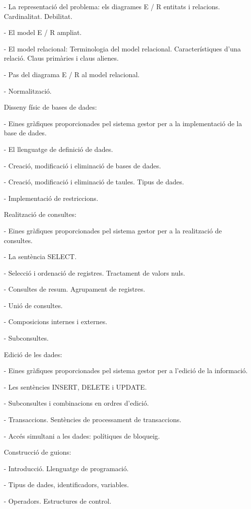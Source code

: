 \documentclass[catalan, a4paper, 12pt, titlepage]{article}
\begin{document}
- La representació del problema: els diagrames E / R entitats i relacions. Cardinalitat. Debilitat.

- El model E / R ampliat.

- El model relacional: Terminologia del model relacional. Característiques d'una relació. Claus primàries i claus alienes.

- Pas del diagrama E / R al model relacional.

- Normalització.

Disseny físic de bases de dades:

- Eines gràfiques proporcionades pel sistema gestor per a la implementació de la base de dades.

- El llenguatge de definició de dades.

- Creació, modificació i eliminació de bases de dades.

- Creació, modificació i eliminació de taules. Tipus de dades.

- Implementació de restriccions.

Realització de consultes:

- Eines gràfiques proporcionades pel sistema gestor per a la realització de consultes.

- La sentència SELECT.

- Selecció i ordenació de registres. Tractament de valors nuls.

- Consultes de resum. Agrupament de registres.

- Unió de consultes.

- Composicions internes i externes.

- Subconsultes.

Edició de les dades:

- Eines gràfiques proporcionades pel sistema gestor per a l'edició de la informació.

- Les sentències INSERT, DELETE i UPDATE.

- Subconsultes i combinacions en ordres d'edició.

- Transaccions. Sentències de processament de transaccions.

- Accés simultani a les dades: polítiques de bloqueig.

Construcció de guions:

- Introducció. Llenguatge de programació.

- Tipus de dades, identificadors, variables.

- Operadors. Estructures de control.
\end{document}
